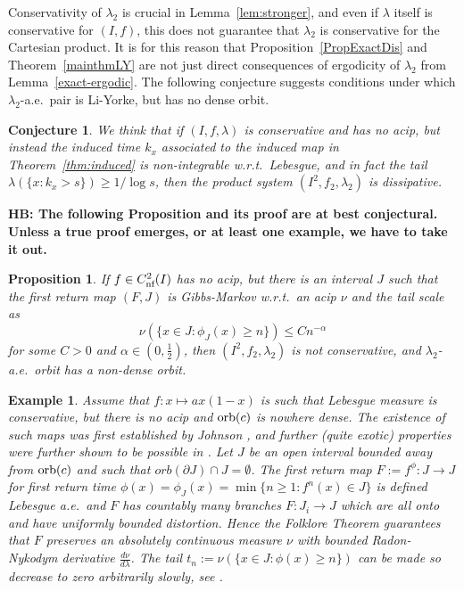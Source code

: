 \documentclass[12pt, psamsfonts, reqno]{amsart}
\newtheorem{proposition}[theorem]{Proposition}
\newtheorem{example}[theorem]{Example}
\newtheorem{conjecture}[theorem]{Conjecture}
\begin{document}
Conservativity of $\lambda_2$ is crucial in
Lemma~\ref{lem:stronger}, and even if $\lambda$ itself is
conservative for $(I,f)$, this does not guarantee that $\lambda_2$
is conservative for the Cartesian product. It is for this reason
that Proposition~\ref{PropExactDis} and Theorem~\ref{mainthmLY}
are not just direct consequences of ergodicity of $\lambda_2$ from
Lemma~\ref{exact-ergodic}. The following conjecture suggests
conditions under which $\lambda_2$-a.e.\ pair is Li-Yorke, but has
no dense orbit.

\begin{conjecture}
We think that if $(I,f, \lambda)$ is conservative and has no acip,
but instead the induced time $k_x$ associated to the induced map
in Theorem~\ref{thm:induced} is non-integrable w.r.t.\ Lebesgue,
and in fact the tail $\lambda(\{ x : k_x > s\}) \ge 1/\log s$,
then the product system $(I^2, f_2, \lambda_2)$ is dissipative.
\end{conjecture}

\iffalse
{\bf HB: The following Proposition and its proof are at best conjectural.
Unless a true proof emerges, or at least one example, we have to take it out.}

\begin{proposition}\label{PropLYnotDense}
If $f \in {C^2_{\text{\rm nf}}}(I)$ has no acip, but there is an interval $J$ such that the first return map $(F,J)$ is Gibbs-Markov w.r.t.\ an acip $\nu$ and the tail
scale as
\[
\nu(\{ x \in J : \phi_J(x) \geq n\}) \leq C n^{-\alpha}
\]
for some $C > 0$ and $\alpha \in (0,\frac12)$, then
$(I^2, f_2, \lambda_2)$ is not conservative, and $\lambda_2$-a.e.\
orbit has a non-dense orbit.
\end{proposition}

\begin{example}\label{ExamLYnotDense}
Assume that $f:x \mapsto ax(1-x)$ is such that Lebesgue measure is
conservative, but there is no acip and ${\mathop{\rm orb}\nolimits}(c)$ is nowhere dense.
The existence of such maps was first established by Johnson \cite{Joh},
and further (quite exotic) properties were further shown to be possible
in \cite{HK,Bruin}.
Let $J$ be an open interval bounded away from ${\mathop{\rm orb}\nolimits}(c)$ and such that
$orb(\partial J) \cap J = \emptyset$.
The first return map $F := f^\phi: J \to J$ for first return time
$\phi(x) = \phi_J(x) = \min\{ n \geq 1 : f^n(x) \in J\}$
is defined Lebesgue a.e.\ and $F$ has countably many branches $F:J_i \to J$
which are all onto and have uniformly bounded distortion.
Hence the Folklore Theorem guarantees that $F$ preserves an absolutely
continuous measure $\nu$ with bounded Radon-Nykodym derivative
$\frac{d\nu}{d\lambda}$.
The tail $t_n := \nu(\{ x \in J : \phi(x) \geq n\})$ can be made so
decrease to zero arbitrarily slowly, see \cite{BNT}.
\end{example}
\end{document}
